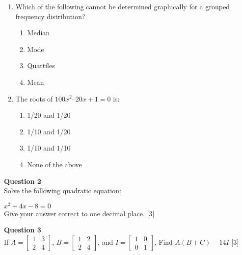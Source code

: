 \begin{enumerate}[label=(\roman*)]
    \item Which of the following cannot be determined graphically for a grouped frequency distribution? 

        \begin{enumerate}[label=(\alph*)]
            \item Median
            \item Mode
            \item Quartiles
            \item Mean
        \end{enumerate}

    \item The roots of $100x^2 – 20x + 1 = 0$ is:

        \begin{enumerate}[label=(\alph*)]
            \item 1/20 and 1/20 
            \item 1/10 and 1/20 
            \item 1/10 and 1/10
            \item None of the above
        \end{enumerate}

\end{enumerate}

\vspace{5mm}
\par
\noindent
\textbf{Question 2}\\
Solve the following quadratic equation:

$x^2 + 4x - 8 = 0$ \\
Give your answer correct to one decimal place. \hfill [3]
        
\vspace{5mm}
\par
\noindent
\textbf{Question 3}\\
If $A = \begin{bmatrix} 1 & 3\\ 2 & 4 \end{bmatrix}$, 
$B = \begin{bmatrix} 1 & 2\\ 2 & 4 \end{bmatrix}$, and
$I = \begin{bmatrix} 1 & 0\\ 0 & 1 \end{bmatrix}$, Find $A(B+C) - 14I$ \hfill [3]

\newpage
